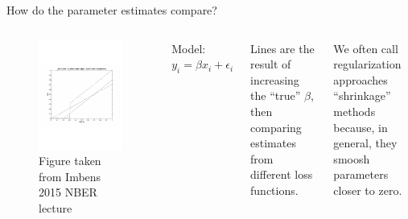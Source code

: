 \documentclass[mathserif, aspectratio=169]{beamer}
\begin{document}
\begin{frame}{How do the parameter estimates compare?}
\begin{columns}
\begin{figure}
\includegraphics[scale=0.45]{lasso-ridge-subset-vs-ols}
\caption*{\tiny Figure taken from Imbens 2015 NBER lecture}
\end{figure}

Model: $	y_i = \beta x_i + \epsilon_i$

\vspace{5mm}

Lines are the result of increasing the ``true'' $\beta$, then comparing estimates from different loss functions.

\vspace{5mm}

We often call regularization approaches ``shrinkage'' methods because, in general, they smoosh parameters closer to zero.
\end{columns}

\end{frame}
\end{document}
